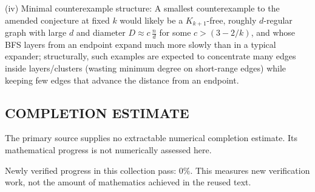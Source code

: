 (iv) Minimal counterexample structure:
A smallest counterexample to the amended conjecture at fixed $k$ would likely be
a $K_{k+1}$-free, roughly $d$-regular graph with large $d$ and diameter
$D\approx c\,\frac{n}{d}$ for some $c>(3-2/k)$, and whose BFS layers from an
endpoint expand much more slowly than in a typical expander; structurally, such
examples are expected to concentrate many edges inside layers/clusters (wasting
minimum degree on short-range edges) while keeping few edges that advance the
distance from an endpoint.




\subsection*{COMPLETION ESTIMATE}
The primary source supplies no extractable numerical completion estimate. Its mathematical progress is not numerically assessed here.

Newly verified progress in this collection pass: $0\%$. This measures new verification work, not the amount of mathematics achieved in the reused text.
